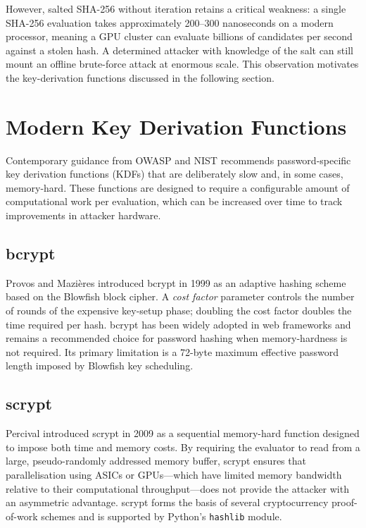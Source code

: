 However, salted SHA-256 without iteration retains a critical weakness: a single SHA-256 evaluation takes approximately 200--300 nanoseconds on a modern processor, meaning a GPU cluster can evaluate billions of candidates per second against a stolen hash. A determined attacker with knowledge of the salt can still mount an offline brute-force attack at enormous scale. This observation motivates the key-derivation functions discussed in the following section.

\section{Modern Key Derivation Functions}
\label{sec:lit_kdfs}

Contemporary guidance from OWASP \cite{owasp2023} and NIST \cite{nist2022} recommends password-specific key derivation functions (KDFs) that are deliberately slow and, in some cases, memory-hard. These functions are designed to require a configurable amount of computational work per evaluation, which can be increased over time to track improvements in attacker hardware.

\subsection{bcrypt}
\label{sec:lit_bcrypt}

Provos and Mazi\`{e}res introduced bcrypt in 1999 \cite{provos1999} as an adaptive hashing scheme based on the Blowfish block cipher. A \emph{cost factor} parameter controls the number of rounds of the expensive key-setup phase; doubling the cost factor doubles the time required per hash. bcrypt has been widely adopted in web frameworks and remains a recommended choice for password hashing when memory-hardness is not required. Its primary limitation is a 72-byte maximum effective password length imposed by Blowfish key scheduling.

\subsection{scrypt}
\label{sec:lit_scrypt}

Percival introduced scrypt in 2009 \cite{percival2009} as a sequential memory-hard function designed to impose both time and memory costs. By requiring the evaluator to read from a large, pseudo-randomly addressed memory buffer, scrypt ensures that parallelisation using ASICs or GPUs---which have limited memory bandwidth relative to their computational throughput---does not provide the attacker with an asymmetric advantage. scrypt forms the basis of several cryptocurrency proof-of-work schemes and is supported by Python's \texttt{hashlib} module.

